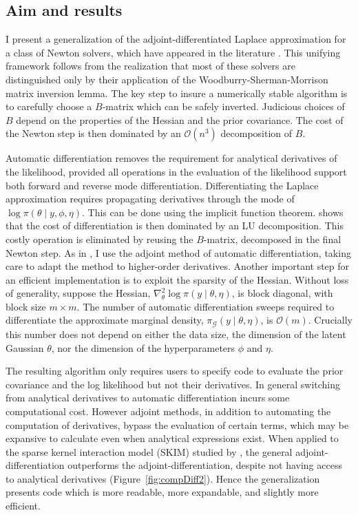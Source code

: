\documentclass[stslayout, noinfoline]{imsart}
\theoremstyle{definition}
\begin{document}
\subsection{Aim and results}

I present a generalization of the adjoint-differentiated Laplace approximation
for a class of Newton solvers, which have appeared in the literature \citep[e.g.][]{Rasmussen:2006, Vanhatalo:2009, Rasmussen:2010, Vanhatalo:2021}.
This unifying framework follows from the realization that most of these solvers are distinguished only by their application of the Woodburry-Sherman-Morrison matrix inversion lemma.
The key step to insure a numerically stable algorithm is to carefully choose a $B$-matrix which can  be safely inverted.
Judicious choices of $B$ depend on the properties of the Hessian and the prior covariance.
The cost of the Newton step is then dominated by an $\mathcal O(n^3)$ decomposition of $B$.

Automatic differentiation removes the requirement for analytical derivatives of the likelihood, provided all operations in the evaluation of the likelihood support both forward and reverse mode differentiation.
Differentiating the Laplace approximation requires propagating derivatives through the mode of $\log \pi(\theta \mid y, \phi, \eta)$.
This can be done using the implicit function theorem.
\citet{Gaebler:2021} shows that the cost of differentiation is then dominated by an LU decomposition.
This costly operation is eliminated by reusing the $B$-matrix, decomposed in the final Newton step.
As in \citet{Margossian:2020-laplace}, I use the adjoint method of automatic differentiation, taking care to adapt the method to higher-order derivatives.
Another important step for an efficient implementation is to exploit the sparsity of the Hessian.
%
Without loss of generality, suppose the Hessian, $\nabla^2_\theta \log \pi(y \mid \theta, \eta)$, is block diagonal, with block size $m \times m$.
The number of automatic differentiation sweeps required to differentiate the approximate marginal density, $\pi_\mathcal{G}(y \mid \theta, \eta)$, is $\mathcal O(m)$.
Crucially this number does not depend on either the data size, the dimension of the latent Gaussian $\theta$, nor the dimension of the hyperparameters $\phi$ and $\eta$.

The resulting algorithm only requires users to specify code to evaluate the prior covariance and the log likelihood but not their derivatives.
In general switching from analytical derivatives to automatic differentiation incurs some computational cost.
However adjoint methods, in addition to automating the computation of derivatives, bypass the evaluation of certain terms, which may be expansive to calculate even when analytical expressions exist.
When applied to the sparse kernel interaction model (SKIM) studied by \citet{Margossian:2020-laplace}, the general adjoint-differentiation outperforms the adjoint-differentiation, despite not having access to analytical derivatives (Figure~\ref{fig:compDiff2}).
Hence the generalization presents code which is more readable, more expandable, and slightly more efficient.
\end{document}
